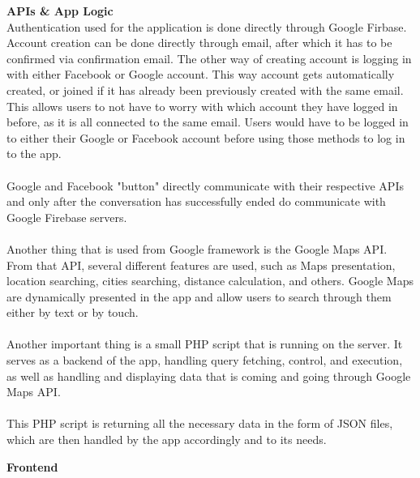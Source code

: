 \textbf{APIs \& App Logic}\\

Authentication used for the application is done directly through Google Firbase. Account creation can be done directly through email, after which it has to be confirmed via confirmation email. The other way of creating account is logging in with either Facebook or Google account. This way account gets automatically created, or joined if it has already been previously created with the same email. This allows users to not have to worry with which account they have logged in before, as it is all connected to the same email. Users would have to be logged in to either their Google or Facebook account before using those methods to log in to the app.\\ \\
Google and Facebook "button" directly communicate with their respective APIs and only after the conversation has successfully ended do communicate with Google Firebase servers. \\ \\
Another thing that is used from Google framework is the Google Maps API. From that API, several different features are used, such as Maps presentation, location searching, cities searching, distance calculation, and others. Google Maps are dynamically presented in the app and allow users to search through them either by text or by touch.\\ \\
Another important thing is a small PHP script that is running on the server. It serves as a backend of the app, handling query fetching, control, and execution, as well as handling and displaying data that is coming and going through Google Maps API.\\ \\ 
This PHP script is returning all the necessary data in the form of JSON files, which are then handled by the app accordingly and to its needs.

\textbf{Frontend}\\

